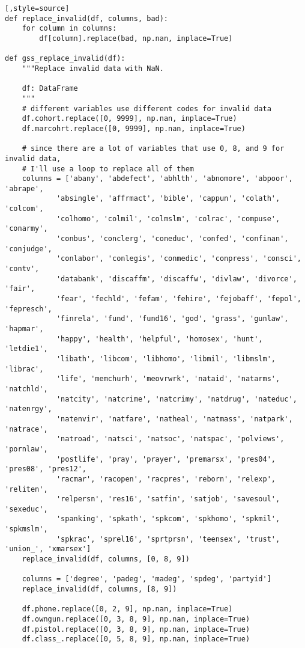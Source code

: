 \begin{lstlisting}[,style=source]
def replace_invalid(df, columns, bad):
    for column in columns:
        df[column].replace(bad, np.nan, inplace=True)

def gss_replace_invalid(df):
    """Replace invalid data with NaN.
    
    df: DataFrame
    """
    # different variables use different codes for invalid data
    df.cohort.replace([0, 9999], np.nan, inplace=True)
    df.marcohrt.replace([0, 9999], np.nan, inplace=True)
        
    # since there are a lot of variables that use 0, 8, and 9 for invalid data,
    # I'll use a loop to replace all of them
    columns = ['abany', 'abdefect', 'abhlth', 'abnomore', 'abpoor', 'abrape', 
            'absingle', 'affrmact', 'bible', 'cappun', 'colath', 'colcom', 
            'colhomo', 'colmil', 'colmslm', 'colrac', 'compuse', 'conarmy', 
            'conbus', 'conclerg', 'coneduc', 'confed', 'confinan', 'conjudge', 
            'conlabor', 'conlegis', 'conmedic', 'conpress', 'consci', 'contv', 
            'databank', 'discaffm', 'discaffw', 'divlaw', 'divorce', 'fair', 
            'fear', 'fechld', 'fefam', 'fehire', 'fejobaff', 'fepol', 'fepresch', 
            'finrela', 'fund', 'fund16', 'god', 'grass', 'gunlaw', 'hapmar', 
            'happy', 'health', 'helpful', 'homosex', 'hunt', 'letdie1', 
            'libath', 'libcom', 'libhomo', 'libmil', 'libmslm', 'librac', 
            'life', 'memchurh', 'meovrwrk', 'nataid', 'natarms', 'natchld', 
            'natcity', 'natcrime', 'natcrimy', 'natdrug', 'nateduc', 'natenrgy', 
            'natenvir', 'natfare', 'natheal', 'natmass', 'natpark', 'natrace', 
            'natroad', 'natsci', 'natsoc', 'natspac', 'polviews', 'pornlaw', 
            'postlife', 'pray', 'prayer', 'premarsx', 'pres04', 'pres08', 'pres12', 
            'racmar', 'racopen', 'racpres', 'reborn', 'relexp', 'reliten', 
            'relpersn', 'res16', 'satfin', 'satjob', 'savesoul', 'sexeduc', 
            'spanking', 'spkath', 'spkcom', 'spkhomo', 'spkmil', 'spkmslm', 
            'spkrac', 'sprel16', 'sprtprsn', 'teensex', 'trust', 'union_', 'xmarsex']
    replace_invalid(df, columns, [0, 8, 9])

    columns = ['degree', 'padeg', 'madeg', 'spdeg', 'partyid']
    replace_invalid(df, columns, [8, 9])
        
    df.phone.replace([0, 2, 9], np.nan, inplace=True)
    df.owngun.replace([0, 3, 8, 9], np.nan, inplace=True)
    df.pistol.replace([0, 3, 8, 9], np.nan, inplace=True)
    df.class_.replace([0, 5, 8, 9], np.nan, inplace=True)
    

\end{lstlisting}
